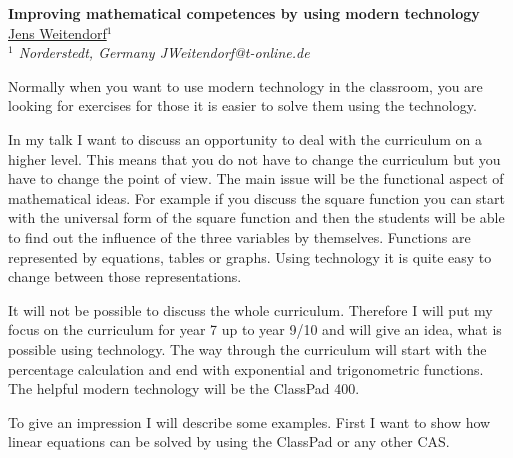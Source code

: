 \documentclass[11pt]{article}
\begin{document}
%
\vspace{-0.8cm}
\begin{flushleft}
\Large \textbf{\noindent
Improving mathematical competences by using modern technology}
\\
\vspace{0.5cm}
\normalsize
\normalsize{
\underline{Jens Weitendorf}$^1$
} \\
\vspace{5mm}
\textit{\footnotesize
$^1$ Norderstedt, Germany
JWeitendorf@t-online.de\\
}
\end{flushleft}

Normally when you want to use modern technology in the classroom, you
are looking for exercises for those it is easier to solve them using
the technology.

In my talk I want to discuss an opportunity to deal with the curriculum on
a higher level. This means that you do not have to change the curriculum
but you have to change the point of view. The main issue will be the
functional aspect of mathematical ideas. For example if you discuss
the square function you can start with the universal form of the square
function and then the students will be able to find out the influence of
the three variables by themselves. Functions are represented by equations,
tables or graphs. Using technology it is quite easy to change between
those representations.

It will not be possible to discuss the whole curriculum. Therefore
I will put my focus on the curriculum for year 7 up to year 9/10 and
will give an idea, what is possible using technology. The way through
the curriculum will start with the percentage calculation and end with
exponential and trigonometric functions.  The helpful modern technology
will be the ClassPad 400.

To give an impression I will describe some examples. First I want to show
how linear equations can be solved by using the ClassPad or any other CAS.
\end{document}
